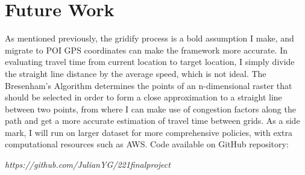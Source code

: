 \documentclass[letterpaper, 10 pt, conference]{ieeeconf}
\begin{document}
\section{Future Work}
As mentioned previously, the gridify process is a bold assumption I make, and migrate to POI GPS coordinates can make the framework more accurate. In evaluating travel time from current location to target location, I simply divide the straight line distance by the average speed, which is not ideal. The Bresenham's Algorithm determines the points of an n-dimensional raster that should be selected in order to form a close approximation to a straight line between two points\cite{bresenham}, from where I can make use of congestion factors along the path and get a more accurate estimation of travel time between grids. As a side mark, I will run on larger dataset for more comprehensive policies, with extra computational resources such as AWS. Code available on GitHub repository:
\begin{center}
\textit{https://github.com/JulianYG/221finalproject}
\end{center}


\end{document}
